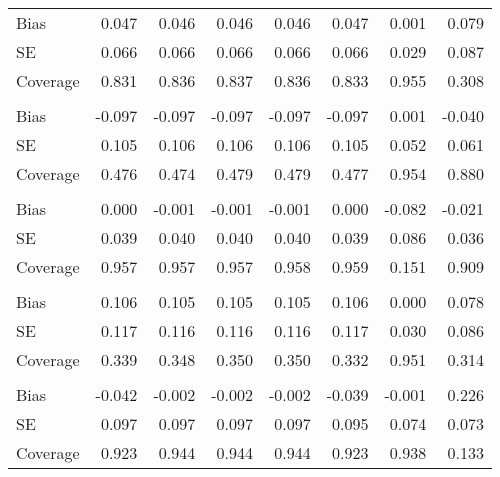 \begin{table}
\begin{tabular}{lddddddd}
\hspace{1em}Bias & 0.047 & 0.046 & 0.046 & 0.046 & 0.047 & 0.001 & 0.079\\
\hspace{1em}SE & 0.066 & 0.066 & 0.066 & 0.066 & 0.066 & 0.029 & 0.087\\
\hspace{1em}Coverage & 0.831 & 0.836 & 0.837 & 0.836 & 0.833 & 0.955 & 0.308\\
\addlinespace[0.3em]
\\
\hspace{1em}Bias & -0.097 & -0.097 & -0.097 & -0.097 & -0.097 & 0.001 & -0.040\\
\hspace{1em}SE & 0.105 & 0.106 & 0.106 & 0.106 & 0.105 & 0.052 & 0.061\\
\hspace{1em}Coverage & 0.476 & 0.474 & 0.479 & 0.479 & 0.477 & 0.954 & 0.880\\
\addlinespace[0.3em]
\\
\hspace{1em}Bias & 0.000 & -0.001 & -0.001 & -0.001 & 0.000 & -0.082 & -0.021\\
\hspace{1em}SE & 0.039 & 0.040 & 0.040 & 0.040 & 0.039 & 0.086 & 0.036\\
\hspace{1em}Coverage & 0.957 & 0.957 & 0.957 & 0.958 & 0.959 & 0.151 & 0.909\\
\addlinespace[0.3em]
\\
\hspace{1em}Bias & 0.106 & 0.105 & 0.105 & 0.105 & 0.106 & 0.000 & 0.078\\
\hspace{1em}SE & 0.117 & 0.116 & 0.116 & 0.116 & 0.117 & 0.030 & 0.086\\
\hspace{1em}Coverage & 0.339 & 0.348 & 0.350 & 0.350 & 0.332 & 0.951 & 0.314\\
\addlinespace[0.3em]
\\
\hspace{1em}Bias & -0.042 & -0.002 & -0.002 & -0.002 & -0.039 & -0.001 & 0.226\\
\hspace{1em}SE & 0.097 & 0.097 & 0.097 & 0.097 & 0.095 & 0.074 & 0.073\\
\hspace{1em}Coverage & 0.923 & 0.944 & 0.944 & 0.944 & 0.923 & 0.938 & 0.133\\
\bottomrule
\end{tabular}
\end{table}
